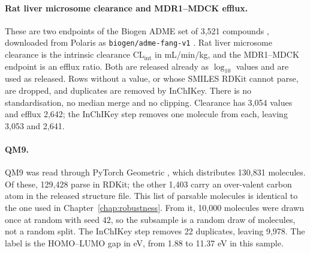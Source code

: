 \paragraph{Rat liver microsome clearance and MDR1--MDCK efflux.} These are two endpoints of the Biogen ADME set of 3,521 compounds \citep{fang2023}, downloaded from Polaris as \texttt{biogen/adme-fang-v1} \citep{polaris}. Rat liver microsome clearance is the intrinsic clearance $\mathrm{CL_{int}}$ in mL/min/kg, and the MDR1--MDCK endpoint is an efflux ratio. Both are released already as $\log_{10}$ values and are used as released. Rows without a value, or whose SMILES RDKit cannot parse, are dropped, and duplicates are removed by InChIKey. There is no standardisation, no median merge and no clipping. Clearance has 3,054 values and efflux 2,642; the InChIKey step removes one molecule from each, leaving 3,053 and 2,641.

\paragraph{QM9.} QM9 \citep{Ramakrishnan2014, qm9_dataset} was read through PyTorch Geometric \citep{pytorchGeometric}, which distributes 130,831 molecules. Of these, 129,428 parse in RDKit; the other 1,403 carry an over-valent carbon atom in the released structure file. This list of parsable molecules is identical to the one used in Chapter~\ref{chap:robustness}. From it, 10,000 molecules were drawn once at random with seed 42, so the subsample is a random draw of molecules, not a random split. The InChIKey step removes 22 duplicates, leaving 9,978. The label is the HOMO--LUMO gap in eV, from 1.88 to 11.37 eV in this sample.

